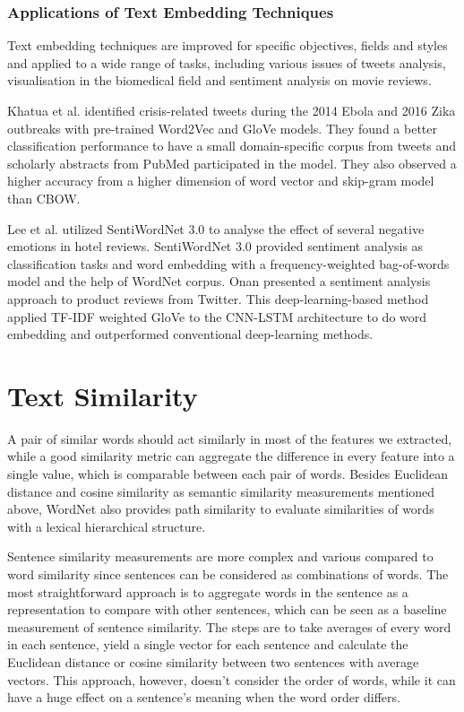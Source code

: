 \subsubsection{Applications of Text Embedding Techniques}
Text embedding techniques are improved for specific objectives, fields and styles and applied to a wide range of tasks, including various issues of tweets analysis\cite{mottaghinia2021}, visualisation in the biomedical field\cite{oubenali2022} and sentiment analysis on movie reviews\cite{sivakumar2021}.

Khatua et al.\cite{khatua2019} identified crisis-related tweets during the 2014 Ebola and 2016 Zika outbreaks with pre-trained Word2Vec and GloVe models.
They found a better classification performance to have a small domain-specific corpus from tweets and scholarly abstracts from PubMed participated in the model.
They also observed a higher accuracy from a higher dimension of word vector and skip-gram model than CBOW.

Lee et al.\cite{lee2017} utilized SentiWordNet 3.0 to analyse the effect of several negative emotions in hotel reviews.
SentiWordNet 3.0\cite{baccianella2010} provided sentiment analysis as classification tasks and word embedding with a frequency-weighted bag-of-words model and the help of WordNet corpus.
Onan\cite{onan2021} presented a sentiment analysis approach to product reviews from Twitter.
This deep-learning-based method applied TF-IDF weighted GloVe to the CNN-LSTM architecture to do word embedding and outperformed conventional deep-learning methods.


\section{Text Similarity}
A pair of similar words should act similarly in most of the features we extracted, while a good similarity metric can aggregate the difference in every feature into a single value, which is comparable between each pair of words.
Besides Euclidean distance and cosine similarity as semantic similarity measurements mentioned above, WordNet also provides path similarity to evaluate similarities of words with a lexical hierarchical structure.

Sentence similarity measurements are more complex and various compared to word similarity since sentences can be considered as combinations of words.
The most straightforward approach is to aggregate words in the sentence as a representation to compare with other sentences, which can be seen as a baseline measurement of sentence similarity.
The steps are to take averages of every word in each sentence, yield a single vector for each sentence and calculate the Euclidean distance or cosine similarity between two sentences with average vectors.
This approach, however, doesn't consider the order of words, while it can have a huge effect on a sentence's meaning when the word order differs.

